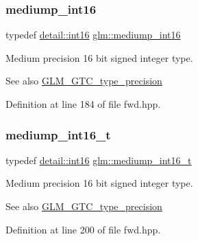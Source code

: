\subsubsection{\texorpdfstring{mediump\+\_\+int16}{mediump\_int16}}
{\footnotesize\ttfamily typedef \hyperlink{namespaceglm_1_1detail_a375938874ca4f0a0982ec6373b56117b}{detail\+::int16} \hyperlink{group__gtc__type__precision_ga4611997edb6c61606daa11990cf08798}{glm\+::mediump\+\_\+int16}}

Medium precision 16 bit signed integer type. \begin{DoxySeeAlso}{See also}
\hyperlink{group__gtc__type__precision}{G\+L\+M\+\_\+\+G\+T\+C\+\_\+type\+\_\+precision} 
\end{DoxySeeAlso}


Definition at line 184 of file fwd.\+hpp.

\mbox{\label{group__gtc__type__precision_ga478fab608cf43040013d719a3e03b194}} 
\subsubsection{\texorpdfstring{mediump\+\_\+int16\+\_\+t}{mediump\_int16\_t}}
{\footnotesize\ttfamily typedef \hyperlink{namespaceglm_1_1detail_a375938874ca4f0a0982ec6373b56117b}{detail\+::int16} \hyperlink{group__gtc__type__precision_ga478fab608cf43040013d719a3e03b194}{glm\+::mediump\+\_\+int16\+\_\+t}}

Medium precision 16 bit signed integer type. \begin{DoxySeeAlso}{See also}
\hyperlink{group__gtc__type__precision}{G\+L\+M\+\_\+\+G\+T\+C\+\_\+type\+\_\+precision} 
\end{DoxySeeAlso}


Definition at line 200 of file fwd.\+hpp.

\mbox{\label{group__gtc__type__precision_ga0660a752402702f420f13c686a7fff29}} 
